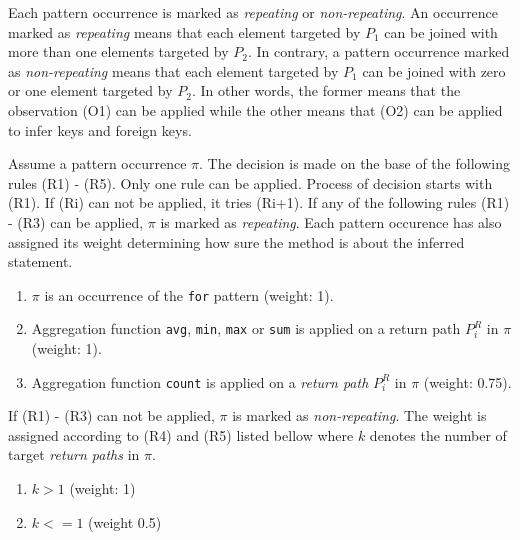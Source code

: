 Each pattern occurrence is marked as \emph{repeating} or \emph{non-repeating}. An occurrence marked as \emph{repeating} means that each element targeted by $P_1$ can be joined with more than one elements targeted by $P_2$. In contrary, a pattern occurrence marked as \emph{non-repeating} means that each element targeted by $P_1$ can be joined with zero or one element targeted by $P_2$. In other words, the former means that the observation (O1) can be applied while the other means that (O2) can be applied to infer keys and foreign keys.

Assume a pattern occurrence $\pi$. The decision is made on the base of the following rules (R1) - (R5). Only one rule can be applied. Process of decision starts with (R1). If (Ri) can not be applied, it tries (Ri+1). If any of the following rules (R1) - (R3) can be applied, $\pi$ is marked as \emph{repeating}. Each pattern occurence has also assigned its weight determining how sure the method is about the inferred statement.

\begin{enumerate}
\renewcommand{\theenumi}{(R\arabic{enumi})}
\renewcommand{\labelenumi}{\theenumi}
\item $\pi$ is an occurrence of the \texttt{for} pattern (weight: 1).
\item Aggregation function \texttt{avg}, \texttt{min}, \texttt{max} or \texttt{sum} is applied on a return path $P_i^R$ in $\pi$ (weight: 1).
\item Aggregation function \texttt{count} is applied on a \emph{return path} $P_i^R$ in $\pi$ (weight: 0.75).
\end{enumerate}

If (R1) - (R3) can not be applied, $\pi$ is marked as \emph{non-repeating}. The weight is assigned according to (R4) and (R5) listed bellow where $k$ denotes the number of target \emph{return paths} in $\pi$.

\begin{enumerate}
\renewcommand{\theenumi}{(R\arabic{enumi})}
\renewcommand{\labelenumi}{\theenumi}
\setcounter{enumi}{4}
\item $k > 1$ (weight: 1)
\item$ k <= 1$ (weight 0.5)
\end{enumerate}

